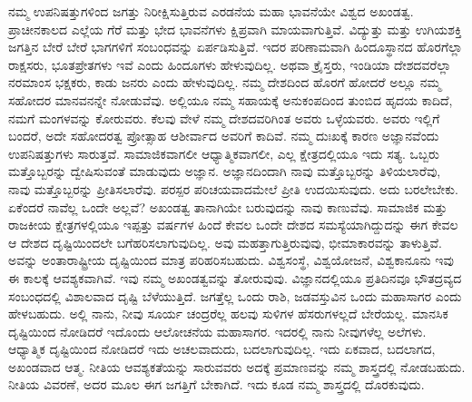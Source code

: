 ನಮ್ಮ ಉಪನಿಷತ್ತುಗಳಿಂದ ಜಗತ್ತು ನಿರೀಕ್ಷಿಸುತ್ತಿರುವ ಎರಡನೆಯ ಮಹಾ ಭಾವನೆಯೇ ವಿಶ್ವದ ಅಖಂಡತ್ವ. ಪ್ರಾಚೀನಕಾಲದ ಎಲ್ಲೆಯ ಗೆರೆ ಮತ್ತು ಭೇದ ಭಾವನೆಗಳು ಕ್ಷಿಪ್ರವಾಗಿ ಮಾಯವಾಗುತ್ತಿವೆ. ವಿದ್ಯುತ್ತು ಮತ್ತು ಉಗಿಯಶಕ್ತಿ ಜಗತ್ತಿನ ಬೇರೆ ಬೇರೆ ಭಾಗಗಳಿಗೆ ಸಂಬಂಧವನ್ನು ಏರ್ಪಡಿಸುತ್ತಿವೆ. ಇದರ ಪರಿಣಾಮವಾಗಿ ಹಿಂದೂಸ್ಥಾನದ ಹೊರಗೆಲ್ಲಾ ರಾಕ್ಷಸರು, ಭೂತಪ್ರೇತಗಳು ಇವೆ ಎಂದು ಹಿಂದೂಗಳು ಹೇಳುವುದಿಲ್ಲ. ಅಥವಾ ಕ್ರೈಸ್ತರು, ಇಂಡಿಯಾ ದೇಶದವರೆಲ್ಲಾ ನರಮಾಂಸ ಭಕ್ಷಕರು, ಕಾಡು ಜನರು ಎಂದು ಹೇಳುವುದಿಲ್ಲ. ನಮ್ಮ ದೇಶದಿಂದ ಹೊರಗೆ ಹೋದರೆ ಅಲ್ಲೂ ನಮ್ಮ ಸಹೋದರ ಮಾನವನನ್ನೇ ನೋಡುವೆವು. ಅಲ್ಲಿಯೂ ನಮ್ಮ ಸಹಾಯಕ್ಕೆ ಅನುಕಂಪದಿಂದ ತುಂಬಿದ ಹೃದಯ ಕಾದಿದೆ, ನಮಗೆ ಮಂಗಳವನ್ನು ಕೋರುವರು. ಕೆಲವು ವೇಳೆ ನಮ್ಮ ದೇಶದವರಿಗಿಂತ ಅವರು ಒಳ್ಳೆಯವರು. ಅವರು ಇಲ್ಲಿಗೆ ಬಂದರೆ, ಅದೇ ಸಹೋದರತ್ವ ಪ್ರೋತ್ಸಾಹ ಆಶೀರ್ವಾದ ಅವರಿಗೆ ಕಾದಿವೆ. ನಮ್ಮ ದುಃಖಕ್ಕೆ ಕಾರಣ ಅಜ್ಞಾನವೆಂದು ಉಪನಿಷತ್ತುಗಳು ಸಾರುತ್ತವೆ. ಸಾಮಾಜಿಕವಾಗಲೀ ಆಧ್ಯಾತ್ಮಿಕವಾಗಲೀ, ಎಲ್ಲ ಕ್ಷೇತ್ರದಲ್ಲಿಯೂ ಇದು ಸತ್ಯ. ಒಬ್ಬರು ಮತ್ತೊಬ್ಬರನ್ನು ದ್ವೇಷಿಸುವಂತೆ ಮಾಡುವುದು ಅಜ್ಞಾನ. ಅಜ್ಞಾನದಿಂದಾಗಿ ನಾವು ಮತ್ತೊಬ್ಬರನ್ನು ತಿಳಿಯಲಾರೆವು, ನಾವು ಮತ್ತೊಬ್ಬರನ್ನು ಪ್ರೀತಿಸಲಾರೆವು. ಪರಸ್ಪರ ಪರಿಚಯವಾದಮೇಲೆ ಪ್ರೀತಿ ಉದಯಿಸುವುದು. ಅದು ಬರಲೇಬೇಕು. ಏಕೆಂದರೆ ನಾವೆಲ್ಲ ಒಂದೇ ಅಲ್ಲವೆ? ಅಖಂಡತ್ವ ತಾನಾಗಿಯೇ ಬರುವುದನ್ನು ನಾವು ಕಾಣುವೆವು. ಸಾಮಾಜಿಕ ಮತ್ತು ರಾಜಕೀಯ ಕ್ಷೇತ್ರಗಳಲ್ಲಿಯೂ ಇಪ್ಪತ್ತು ವರ್ಷಗಳ ಹಿಂದೆ ಕೇವಲ ಒಂದೇ ದೇಶದ ಸಮಸ್ಯೆಯಾಗಿದ್ದುದನ್ನು ಈಗ ಕೇವಲ ಆ ದೇಶದ ದೃಷ್ಟಿಯಿಂದಲೇ ಬಗೆಹರಿಸಲಾಗುವುದಿಲ್ಲ. ಅವು ಮಹತ್ತಾಗುತ್ತಿರುವುವು, ಭೀಮಾಕಾರವನ್ನು ತಾಳುತ್ತಿವೆ. ಅವನ್ನು ಅಂತಾರಾಷ್ಟ್ರೀಯ ದೃಷ್ಟಿಯಿಂದ ಮಾತ್ರ ಪರಿಹರಿಸಬಹುದು. ವಿಶ್ವಸಂಸ್ಥೆ, ವಿಶ್ವಯೋಜನೆ, ವಿಶ್ವಕಾನೂನು ಇವು ಈ ಕಾಲಕ್ಕೆ ಆವಶ್ಯಕವಾಗಿವೆ. ಇವು ನಮ್ಮ ಅಖಂಡತ್ವವನ್ನು ತೋರುವುವು. ವಿಜ್ಞಾನದಲ್ಲಿಯೂ ಪ್ರತಿದಿನವೂ ಭೌತದ್ರವ್ಯದ ಸಂಬಂಧದಲ್ಲಿ ವಿಶಾಲವಾದ ದೃಷ್ಟಿ ಬೆಳೆಯುತ್ತಿದೆ. ಜಗತ್ತೆಲ್ಲ ಒಂದು ರಾಶಿ, ಜಡವಸ್ತುವಿನ ಒಂದು ಮಹಾಸಾಗರ  ಎಂದು ಹೇಳಬಹುದು. ಅಲ್ಲಿ ನಾನು, ನೀವು ಸೂರ್ಯ ಚಂದ್ರರೆಲ್ಲ ಹಲವು ಸುಳಿಗಳ ಹೆಸರುಗಳಲ್ಲದೆ ಬೇರೆಯಲ್ಲ. ಮಾನಸಿಕ ದೃಷ್ಟಿಯಿಂದ ನೋಡಿದರೆ ಇದೊಂದು ಆಲೋಚನೆಯ ಮಹಾಸಾಗರ. ಇದರಲ್ಲಿ ನಾನು ನೀವುಗಳೆಲ್ಲ ಅಲೆಗಳು. ಆಧ್ಯಾತ್ಮಿಕ ದೃಷ್ಟಿಯಿಂದ ನೋಡಿದರೆ ಇದು ಅಚಲವಾದುದು, ಬದಲಾಗುವುದಿಲ್ಲ. ಇದು ಏಕವಾದ, ಬದಲಾಗದ, ಅಖಂಡವಾದ ಆತ್ಮ. ನೀತಿಯ ಆವಶ್ಯಕತೆಯನ್ನು ಸಾರುವವರು ಅದಕ್ಕೆ ಪ್ರಮಾಣವನ್ನು ನಮ್ಮ ಶಾಸ್ತ್ರದಲ್ಲಿ ನೋಡಬಹುದು. ನೀತಿಯ ವಿವರಣೆ, ಅದರ ಮೂಲ ಈಗ ಜಗತ್ತಿಗೆ ಬೇಕಾಗಿದೆ. ಇದು ಕೂಡ ನಮ್ಮ ಶಾಸ್ತ್ರದಲ್ಲಿ ದೊರಕುವುದು.

\vskip   4pt

